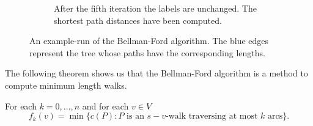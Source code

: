 \begin{figure}
\begin{subfigure}[t]{0.45\textwidth}

     
     \caption{
   After the fifth  iteration the labels are unchanged. The shortest
   path distances have been computed. 
}
   \end{subfigure}
   
 \caption{An example-run of the Bellman-Ford algorithm. The blue
     edges represent the tree whose paths have the corresponding lengths.} \label{f:fig:5}

 \end{figure}




The following theorem shows us that the Bellman-Ford algorithm is a 
method to compute minimum length walks.


\begin{theorem}
  \label{f:thr:1}
  For each $k=0,\ldots,n$ and for each $v \in V$ 
  \begin{displaymath}
    f_k(v)  = \min\{ c(P) \colon  P \text{ is an } s-v\text{-walk traversing
    at most } k \text{ arcs}\}.
  \end{displaymath}
\end{theorem}

